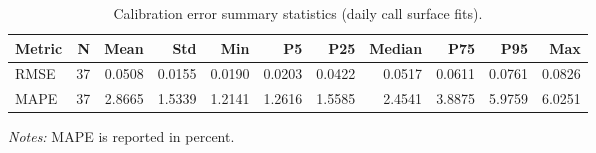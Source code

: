 \begin{table}[!htbp]
\centering
\small
\setlength{\tabcolsep}{4pt}
\renewcommand{\arraystretch}{1.15}
\caption{Calibration error summary statistics (daily call surface fits).}
\label{tab:call_fit_error_summary}
\begin{tabular}{lrrrrrrrrrr}
\toprule
Metric & N & Mean & Std & Min & P5 & P25 & Median & P75 & P95 & Max \\
\midrule
RMSE & 37 & 0.0508 & 0.0155 & 0.0190 & 0.0203 & 0.0422 & 0.0517 & 0.0611 & 0.0761 & 0.0826 \\
MAPE & 37 & 2.8665 & 1.5339 & 1.2141 & 1.2616 & 1.5585 & 2.4541 & 3.8875 & 5.9759 & 6.0251 \\
\bottomrule
\end{tabular}
\vspace{2pt}
\begin{minipage}{0.95\linewidth}\footnotesize \emph{Notes:} MAPE is reported in percent. \end{minipage}
\end{table}